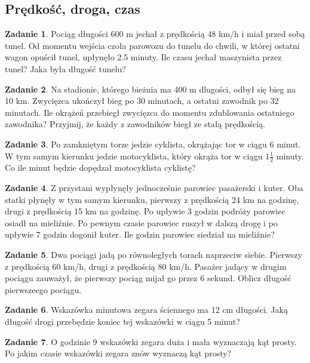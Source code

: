 \documentclass[11pt]{article}
\theoremstyle{definition}
\newtheorem{zad}{Zadanie}
\begin{document}
\subsection{Prędkość, droga, czas}

\begin{zad}
Pociąg długości $600$ m jechał z prędkością $48$ km/h i miał przed sobą tunel. Od momentu wejścia czoła parowozu do tunelu do chwili, w której ostatni wagon opuścił tunel, upłynęło 2.5 minuty. Ile czasu jechał maszynista przez tunel? Jaka była długość tunelu?
\end{zad}

\begin{zad}
Na stadionie, którego bieżnia ma 400 m dlugości, odbył się bieg na 10 km. Zwycięzca ukończył bieg po 30 minutach, a ostatni zawodnik po 32 minutach. Ile okrążeń przebiegł zwycięzca do momentu zdublowania ostatniego zawodnika? Przyjmij, że każdy z zawodników biegł ze stałą prędkością.
\end{zad}

\begin{zad}
Po zamkniętym torze jedzie cyklista, okrążając tor w ciągu 6 minut. W tym samym kierunku jedzie motocyklista, który okrąża tor w ciągu $1\frac12$ minuty. Co ile minut będzie dopędzał motocyklista cyklistę?
\end{zad}

\begin{zad}
Z przystani wypłynęły jednocześnie parowiec pasażerski i kuter. Oba statki płynęły w tym samym kierunku, pierwszy z prędkością 24 km na godzinę, drugi z prędkością 15 km na godzinę. Po upływie 3 godzin podróży parowiec osiadł na mieliźnie. Po pewnym czasie parowiec ruszył w dalszą drogę i po upływie 7 godzin dogonił kuter. Ile godzin parowiec siedział na mieliźnie?
\end{zad}

\begin{zad}
Dwa pociągi jadą po równoległych torach naprzeciw siebie. Pierwszy z prędkością 60 km/h, drugi z prędkością 80 km/h. Pasażer jadący w drugim pociągu zauważył, że pierwszy pociąg mijał go przez 6 sekund. Oblicz długość pierwszeego pociągu.
\end{zad}

\begin{zad}
Wskazówka minutowa zegara ściennego ma 12 cm długości. Jaką długość drogi przebędzie koniec tej wskazówki w ciągu 5 minut?
\end{zad}

\begin{zad}
O godzinie 9 wskazówki zegara duża i mała wyznaczają kąt prosty. Po jakim czasie wskazówki zegara znów wyznaczą kąt prosty?
\end{zad}
\end{document}
